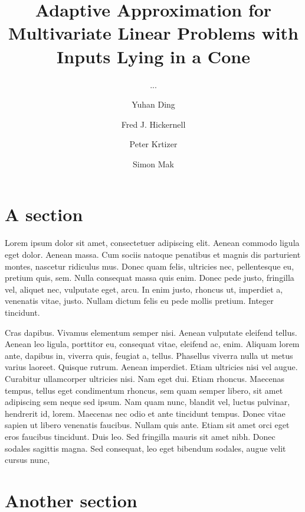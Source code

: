 \documentclass[USenglish]{article}
\begin{document}

  \author*[1]{Yuhan Ding}
  \author[2]{Fred J. Hickernell}
  \author[3]{Peter Krtizer} 
  \author[4]{Simon Mak}
  \title{Adaptive Approximation for Multivariate Linear Problems with Inputs Lying in a Cone}
  \subtitle{...}
  \dedication{...}
  \aop

\maketitle

\section{A section} 

Lorem ipsum dolor sit amet, consectetuer adipiscing elit. Aenean commodo ligula eget dolor. Aenean
  massa. Cum sociis natoque penatibus et magnis dis parturient montes, nascetur ridiculus mus. Donec
  quam felis, ultricies nec, pellentesque eu, pretium quis, sem. Nulla consequat massa quis
  enim. Donec pede justo, fringilla vel, aliquet nec, vulputate eget, arcu. In enim justo, rhoncus
  ut, imperdiet a, venenatis vitae, justo. Nullam dictum felis eu pede mollis pretium. Integer
  tincidunt.

  Cras dapibus. Vivamus elementum semper nisi. Aenean vulputate eleifend tellus. Aenean
  leo ligula, porttitor eu, consequat vitae, eleifend ac, enim. Aliquam lorem ante, dapibus in,
  viverra quis, feugiat a, tellus. Phasellus viverra nulla ut metus varius laoreet. Quisque
  rutrum. Aenean imperdiet. Etiam ultricies nisi vel augue. Curabitur ullamcorper ultricies
  nisi. Nam eget dui. Etiam rhoncus. Maecenas tempus, tellus eget condimentum rhoncus, sem quam
  semper libero, sit amet adipiscing sem neque sed ipsum. Nam quam nunc, blandit vel, luctus
  pulvinar, hendrerit id, lorem. Maecenas nec odio et ante tincidunt tempus. Donec vitae sapien ut
  libero venenatis faucibus. Nullam quis ante. Etiam sit amet orci eget eros faucibus
  tincidunt. Duis leo. Sed fringilla mauris sit amet nibh. Donec sodales sagittis magna. Sed
  consequat, leo eget bibendum sodales, augue velit cursus nunc,

\section{Another section} 
\end{document}
